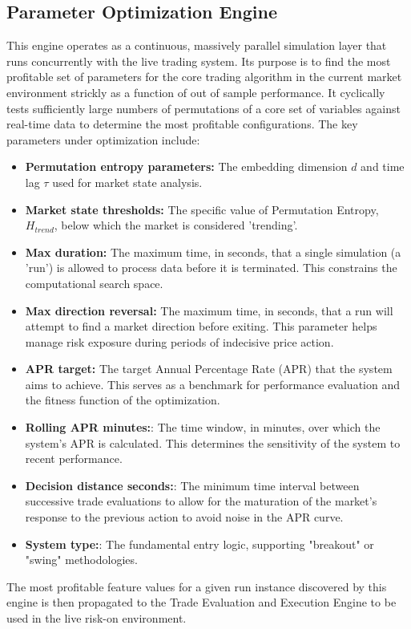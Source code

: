 \documentclass[10pt]{article}
\begin{document}
\subsection{Parameter Optimization Engine}
This engine operates as a continuous, massively parallel simulation layer that runs concurrently with the live trading system. Its purpose is to find the most profitable set of parameters for the core trading algorithm in the current market environment strickly as a function of out of sample performance. It cyclically tests sufficiently large numbers of permutations of a core set of variables against real-time data to determine the most profitable configurations. The key parameters under optimization include:
\begin{itemize}
    \item \textbf{Permutation entropy parameters:} The embedding dimension $d$ and time lag $\tau$ used for market state analysis.
    \item \textbf{Market state thresholds:} The specific value of Permutation Entropy, $H_{trend}$, below which the market is considered 'trending'.
    \item \textbf{Max duration:} The maximum time, in seconds, that a single simulation (a 'run') is allowed to process data before it is terminated. This constrains the computational search space.
    \item \textbf{Max direction reversal:} The maximum time, in seconds, that a run will attempt to find a market direction before exiting. This parameter helps manage risk exposure during periods of indecisive price action.
    \item \textbf{APR target:} The target Annual Percentage Rate (APR) that the system aims to achieve. This serves as a benchmark for performance evaluation and the fitness function of the optimization.
    \item \textbf{Rolling APR minutes:}: The time window, in minutes, over which the system's APR is calculated. This determines the sensitivity of the system to recent performance.
    \item \textbf{Decision distance seconds:}: The minimum time interval between successive trade evaluations to allow for the maturation of the market's response to the previous action to avoid noise in the APR curve.
    \item \textbf{System type:}: The fundamental entry logic, supporting "breakout" or "swing" methodologies.
\end{itemize}
The most profitable feature values for a given run instance discovered by this engine is then propagated to the Trade Evaluation and Execution Engine to be used in the live risk-on environment.
\end{document}
